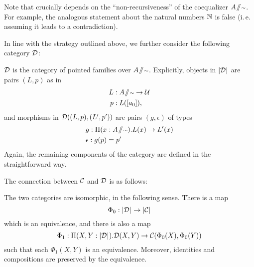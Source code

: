 \begin{remark}
Note that  crucially depends on the ``non-recur\-siveness''
of the coequalizer $A \! \sslash \! {\scriptstyle \sim}$.
For example, the analogous statement about the natural numbers $\mathbb{N}$ is false
(i.\,e. assuming it leads to a contradiction).
\end{remark}

In line with the strategy outlined above, we further consider the following
category $\mathcal D$:
\begin{defn}\label{def:paths-catD}
 $\mathcal D$ is the category of pointed families over $A \! \sslash \! {\scriptstyle \sim}$.
 Explicitly, objects in $\mathopen{}\left|\mathcal D\right|_{}^{}\mathclose{}$ are pairs $(L,p)$ as in
 \begin{align*}
  L &: A \! \sslash \! {\scriptstyle \sim} \to \mathcal{U} \\
  p &: L([a_0]),
 \end{align*}
 and morphisms in $\mathcal D((L,p), (L',p'))$ are pairs $(g,\epsilon)$ of types 
 \begin{align}
  & g : \Pi(x : A \! \sslash \! {\scriptstyle \sim}). L(x) \to L'(x) \label{eq:D0-morph-g}  \\
  & \epsilon : g(p) = p' \label{eq:D0-morph-e}
 \end{align}
 Again, the remaining components of the category are defined in the straightforward way.
\end{defn}

The connection between $\mathcal C$ and $\mathcal D$ is as follows:
\begin{lemma} \label{lem:paths-cats-are-iso}
 The two categories are isomorphic, in the following sense.
 There is a map
 \begin{equation} \label{eq:Phi0-folded}
  \Phi_0 : \mathopen{}\left|\mathcal D\right|_{}^{}\mathclose{} \to \mathopen{}\left|\mathcal C\right|_{}^{}\mathclose{}
 \end{equation}
 which is an equivalence, and there is also a map
 \begin{equation} \label{eq:Phi1-folded}
  \Phi_1 : \Pi (X,Y : \mathopen{}\left|\mathcal D\right|_{}^{}\mathclose{}). \mathcal D(X,Y) \to \mathcal C(\Phi_0(X),\Phi_0(Y))
 \end{equation}
 such that each $\Phi_1(X,Y)$ is an equivalence.
 Moreover, identities and compositions are preserved by the equivalence.
\end{lemma}

